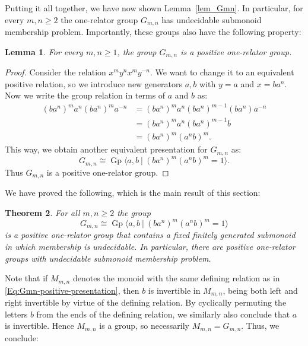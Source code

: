 \documentclass{amsart}
\newcommand{\Gpres}[2]{\operatorname{Gp}\bigl\langle #1\:|\:#2 \bigr\rangle}
\theoremstyle{plain}
\newtheorem{theorem}{Theorem}[section]
\newtheorem{lemma}[theorem]{Lemma}
\theoremstyle{definition}
\begin{document}
Putting it all together, we have now shown Lemma~\ref{lem_Gmn}. In particular, for every $m, n \geq 2$ the one-relator group $G_{m,n}$ has undecidable submonoid membership problem. Importantly, these groups also have the following property:

\begin{lemma}\label{lem_key} 
For every $m, n \geq 1$, the group $G_{m,n}$ is a positive one-relator group. 
\end{lemma}
\begin{proof}
Consider the relation $x^m y^n x^m y^{-n}$. We want to change it to an equivalent positive relation, so we introduce new generators $a,b$ with $y = a$ and $x = b a ^{n}$. Now we write the group relation in terms of $a$ and $b$ as:
\begin{align*}
(b a^{n})^m a^n (b a^{n})^m a^{-n} & = (b a^{n})^m a^n (b a^{n})^{m-1} (b a^{n}) a^{-n} \\
& = (b a^{n})^m a^n (b a^{n})^{m-1} b \\
 & = (b a^{n})^m (a^{n} b)^m.
\end{align*}
This way, we obtain another equivalent presentation for $G_{m,n}$ as:
\begin{equation}\label{Eq:Gmn-positive-presentation}
G_{m,n} \cong \Gpres{a,b}{(b a^n)^m(a^n b)^m = 1}.
\end{equation}
Thus $G_{m,n}$ is a positive one-relator group.
\end{proof}

We have proved the following, which is the main result of this section:

\begin{theorem}\label{thm_mainPositive} 
For all $m,n \geq 2$ the group 
\[
G_{m,n} \cong \Gpres{a,b}{(b a^n)^m(a^n b)^m = 1}
\]
is a positive one-relator group that contains a fixed finitely generated submonoid in which membership is undecidable. 
In particular, there are positive one-relator groups with undecidable submonoid membership problem.  
  \end{theorem}

Note that if $M_{m,n}$ denotes the monoid with the same defining relation as in \eqref{Eq:Gmn-positive-presentation}, then $b$ is invertible in $M_{m,n}$, being both left and right invertible by virtue of the defining relation. By cyclically permuting the letters $b$ from the ends of the defining relation, we similarly also conclude that $a$ is invertible. Hence $M_{m,n}$ is a group, so necessarily $M_{m,n} = G_{m,n}$. Thus, we conclude: 
\end{document}
